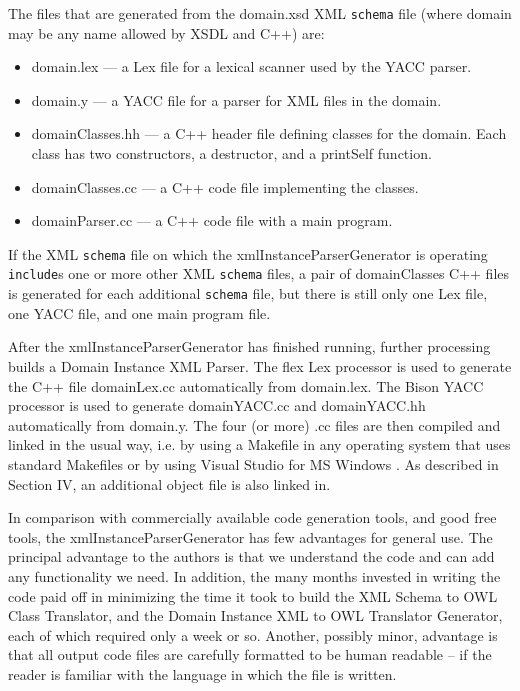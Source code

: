 \documentclass[preprint,12pt]{elsarticle}
\begin{document}
The files that are generated from the domain.xsd XML {\tt schema} file
(where domain may be any name allowed by XSDL and C++) are:
\begin{itemize}
\item[] domain.lex –-- a Lex file for a lexical scanner used by the YACC parser.
\item[] domain.y --- a YACC file for a parser for XML files in the domain. 
\item[] domainClasses.hh --- a C++ header file defining classes for
      the domain. Each class has two constructors, a destructor, 
      and a printSelf function.
\item[] domainClasses.cc --– a C++ code file implementing the classes.
\item[] domainParser.cc --– a C++ code file with a main program.
\end{itemize}

If the XML {\tt schema} file on which the xmlInstanceParserGenerator is
operating {\tt include}s one or more other XML {\tt schema} files, a pair
of domainClasses C++ files is generated for each additional {\tt schema}
file, but there is still only one Lex file, one YACC file, and one main
program file.

After the xmlInstanceParserGenerator has finished running, further
processing builds a Domain Instance XML Parser. The flex Lex processor \cite{lexAndYacc,flex} is used to generate the C++ file
domainLex.cc automatically from domain.lex. The Bison YACC processor \cite{yacc,lexAndYacc} is used to generate domainYACC.cc
and domainYACC.hh automatically from domain.y. The four (or more) .cc files
are then compiled and linked in the usual way, i.e. by using a Makefile in
any operating system that uses standard Makefiles or by using Visual Studio
for MS Windows \cite{msC++}. As described in Section IV, an additional
object file is also linked in.

In comparison with commercially available code generation tools, and good
free tools, the xmlInstanceParserGenerator has few advantages for general
use. The principal advantage to the authors is that we understand the code
and can add any functionality we need. In addition, the many months
invested in writing the code paid off in minimizing the time it took to
build the XML Schema to OWL Class Translator, and the Domain Instance XML
to OWL Translator Generator, each of which required only a week or so.
Another, possibly minor, advantage is that all output code files are
carefully formatted to be human readable – if the reader is familiar with
the language in which the file is written.
\end{document}
